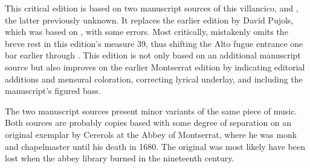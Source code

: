 
\begin{notesources}

\begin{source}
\end{source}

\begin{source}
\end{source}

\begin{source}
\end{source}

\end{notesources}

This critical edition is based on two manuscript sources of this villancico,  and , the latter previously unknown.
It replaces the earlier edition by David Pujols, which was based on , with some errors.
Most critically,  mistakenly omits the breve rest in this edition's measure 39, thus shifting the Alto fugue entrance one bar earlier through .
This edition is not only based on an additional manuscript source but also improves on the earlier Montserrat edition by indicating editorial additions and mensural coloration, correcting lyrical underlay, and including the manuscript's figured bass.

The two manuscript sources present minor variants of the same piece of music.
Both sources are probably copies based with some degree of separation on an original exemplar by Cererols at the Abbey of Montserrat, where he was monk and chapelmaster until his death in 1680.
The original was most likely have been lost when the abbey library burned in the nineteenth century.

